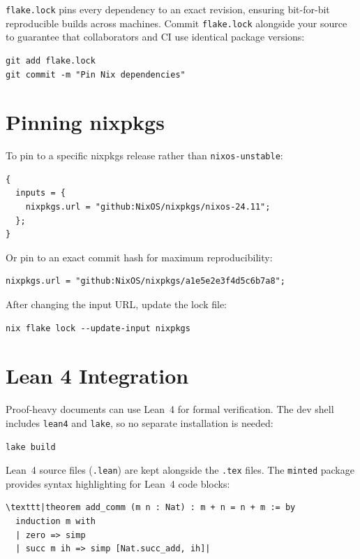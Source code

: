 \texttt{flake.lock} pins every dependency to an exact revision, ensuring
bit-for-bit reproducible builds across machines.  Commit
\texttt{flake.lock} alongside your source to guarantee that collaborators
and CI use identical package versions:

\begin{verbatim}
git add flake.lock
git commit -m "Pin Nix dependencies"
\end{verbatim}

\section{Pinning nixpkgs}

To pin to a specific nixpkgs release rather than \texttt{nixos-unstable}:

\begin{verbatim}
{
  inputs = {
    nixpkgs.url = "github:NixOS/nixpkgs/nixos-24.11";
  };
}
\end{verbatim}

Or pin to an exact commit hash for maximum reproducibility:

\begin{verbatim}
nixpkgs.url = "github:NixOS/nixpkgs/a1e5e2e3f4d5c6b7a8";
\end{verbatim}

After changing the input URL, update the lock file:

\begin{verbatim}
nix flake lock --update-input nixpkgs
\end{verbatim}

\section{Lean 4 Integration}

Proof-heavy documents can use Lean~4 for formal verification.  The dev
shell includes \texttt{lean4} and \texttt{lake}, so no separate
installation is needed:

\begin{verbatim}
lake build
\end{verbatim}

Lean~4 source files (\texttt{.lean}) are kept alongside the
\texttt{.tex} files.  The \texttt{minted} package provides syntax
highlighting for Lean~4 code blocks:

\begin{verbatim}
\texttt|theorem add_comm (m n : Nat) : m + n = n + m := by
  induction m with
  | zero => simp
  | succ m ih => simp [Nat.succ_add, ih]|
\end{verbatim}

